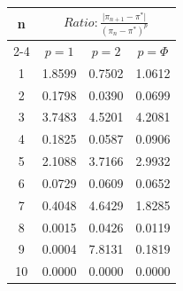 \documentclass{article}
\providecommand{\abs}[1]{\lvert#1\rvert}
\begin{document}
\begin{tabular}{|c|c|c|c|}
\hline
\multirow{2}{*}{n} & \multicolumn{3}{|c|}{$Ratio:\displaystyle\frac{\abs{\pi_{n+1}-\pi^*}}{({\pi_{n}-\pi^*})^p}$} \\
\cline{2-4}
 & $p=1$ & $p=2$ & $p=\Phi$ \\
\hline
 1 & 1.8599 & 0.7502 & 1.0612 \\ 
  2 & 0.1798 & 0.0390 & 0.0699 \\ 
  3 & 3.7483 & 4.5201 & 4.2081 \\ 
  4 & 0.1825 & 0.0587 & 0.0906 \\ 
  5 & 2.1088 & 3.7166 & 2.9932 \\ 
  6 & 0.0729 & 0.0609 & 0.0652 \\ 
  7 & 0.4048 & 4.6429 & 1.8285 \\ 
  8 & 0.0015 & 0.0426 & 0.0119 \\ 
  9 & 0.0004 & 7.8131 & 0.1819 \\ 
 10 & 0.0000 & 0.0000 & 0.0000 \\ 
 \hline 
\end{tabular}
\end{document}
